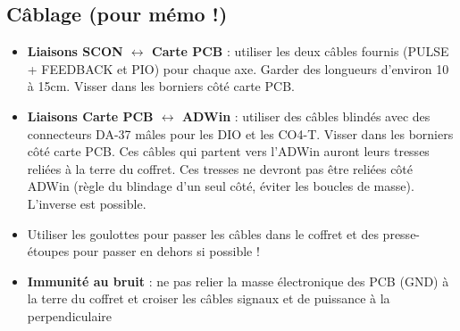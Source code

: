 \documentclass[a4paper,11pt]{beamer}
\begin{document}
\subsection{Câblage (pour mémo !)}
\begin{frame}
\begin{itemize}
\justifying
  \item \textbf{Liaisons SCON $\leftrightarrow$ Carte PCB} : utiliser les deux câbles fournis (PULSE + FEEDBACK et PIO) pour chaque axe. Garder des longueurs d'environ 10 à 15cm. Visser dans les borniers côté carte PCB.
  \item \textbf{Liaisons Carte PCB $\leftrightarrow$ ADWin} : utiliser des câbles blindés avec des connecteurs DA-37 mâles pour les DIO et les CO4-T. Visser dans les borniers côté carte PCB. Ces câbles qui partent vers l'ADWin auront leurs tresses reliées à la terre du coffret. Ces tresses ne devront pas être reliées côté ADWin (règle du blindage d'un seul côté, éviter les boucles de masse). L'inverse est possible.
  \item Utiliser les goulottes pour passer les câbles dans le coffret et des presse-étoupes pour passer en dehors si possible !
  \item \textbf{Immunité au bruit} : ne pas relier la masse électronique des PCB (GND) à la terre du coffret et croiser les câbles signaux et de puissance à la perpendiculaire
\end{itemize}
\end{frame}
\end{document}
